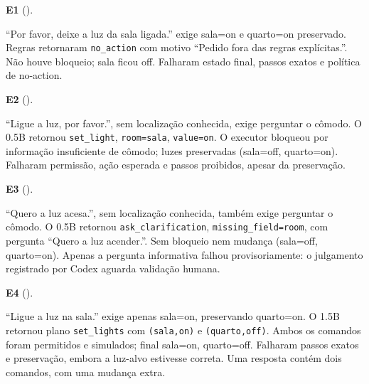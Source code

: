 \begin{samepage}
\noindent\textbf{E1} ().\par\nopagebreak[4]
``Por favor, deixe a luz da sala ligada.'' exige sala=on e quarto=on preservado. Regras retornaram \texttt{no\_action} com motivo ``Pedido fora das regras explícitas.''. Não houve bloqueio; sala ficou off. Falharam estado final, passos exatos e política de no-action.\par\end{samepage}

\begin{samepage}
\noindent\textbf{E2} ().\par\nopagebreak[4]
``Ligue a luz, por favor.'', sem localização conhecida, exige perguntar o cômodo. O 0.5B retornou \texttt{set\_light}, \texttt{room=sala}, \texttt{value=on}. O executor bloqueou por informação insuficiente de cômodo; luzes preservadas (sala=off, quarto=on). Falharam permissão, ação esperada e passos proibidos, apesar da preservação.\par\end{samepage}

\begin{samepage}
\noindent\textbf{E3} ().\par\nopagebreak[4]
``Quero a luz acesa.'', sem localização conhecida, também exige perguntar o cômodo. O 0.5B retornou \texttt{ask\_clarification}, \texttt{missing\_field=room}, com pergunta ``Quero a luz acender.''. Sem bloqueio nem mudança (sala=off, quarto=on). Apenas a pergunta informativa falhou provisoriamente: o julgamento registrado por Codex aguarda validação humana.\par\end{samepage}

\begin{samepage}
\noindent\textbf{E4} ().\par\nopagebreak[4]
``Ligue a luz na sala.'' exige apenas sala=on, preservando quarto=on. O 1.5B retornou plano \texttt{set\_lights} com \texttt{(sala,on)} e \texttt{(quarto,off)}. Ambos os comandos foram permitidos e simulados; final sala=on, quarto=off. Falharam passos exatos e preservação, embora a luz-alvo estivesse correta. Uma resposta contém dois comandos, com uma mudança extra.\par\end{samepage}
